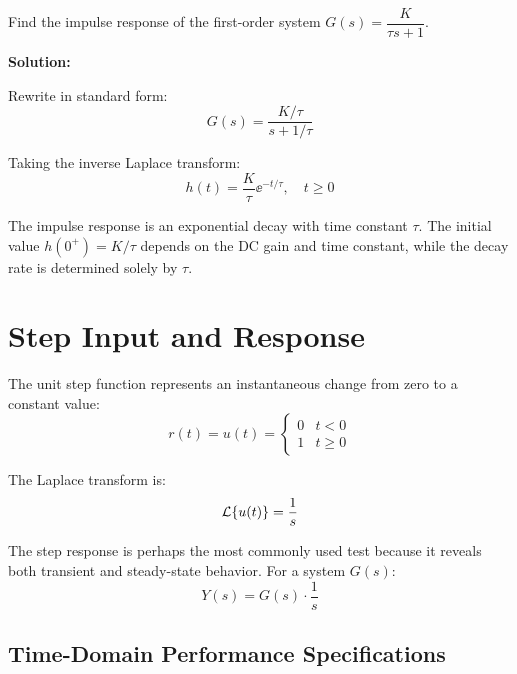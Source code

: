 \begin{examplebox}[title=Example 6.1: Impulse Response of a First-Order System]
Find the impulse response of the first-order system $G(s) = \dfrac{K}{\tau s + 1}$.

\textbf{Solution:}

Rewrite in standard form:
\begin{equation}
G(s) = \frac{K/\tau}{s + 1/\tau}
\end{equation}

Taking the inverse Laplace transform:
\begin{equation}
h(t) = \frac{K}{\tau}\ee^{-t/\tau}, \quad t \geq 0
\end{equation}

The impulse response is an exponential decay with time constant $\tau$. The initial value $h(0^+) = K/\tau$ depends on the DC gain and time constant, while the decay rate is determined solely by $\tau$.
\end{examplebox}

\section{Step Input and Response}
\label{sec:step}

The unit step function represents an instantaneous change from zero to a constant value:
\begin{equation}
r(t) = u(t) = \begin{cases} 0 & t < 0 \\ 1 & t \geq 0 \end{cases}
\end{equation}

The Laplace transform is:
\begin{equation}
\mathcal{L}\{u(t)\} = \frac{1}{s}
\end{equation}

The step response is perhaps the most commonly used test because it reveals both transient and steady-state behavior. For a system $G(s)$:
\begin{equation}
Y(s) = G(s) \cdot \frac{1}{s}
\end{equation}

\subsection{Time-Domain Performance Specifications}

